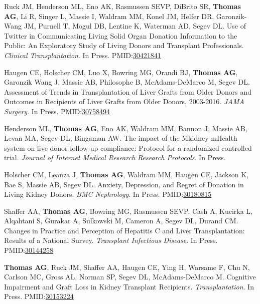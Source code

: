 \documentclass[10pt]{article}
\makeatletter
\newlength{\bibhang}
\newlength{\bibsep}
 {\@listi \global\bibsep\itemsep \global\advance\bibsep by\parsep}
\newenvironment{bibenum*}
  {\renewcommand\labelenumi{[\theenumi]}%
   \etaremune[
     topsep=0pt,
     itemsep=\bibsep,
     parsep=0pt,partopsep=0pt,
     itemindent=-\bibhang,
     leftmargin={\bibhang+\widthof{[999]}}]}
  {\endetaremune}
\newcommand{\pmid}[1]{PMID:\href{https://www.ncbi.nlm.nih.gov/pubmed/#1}{#1}}
\makeatother
\begin{document}
\begin{bibenum*}
\item Ruck JM\dag, Henderson ML\dag, Eno AK, Rasmussen SEVP,
  DiBrito SR, \textbf{Thomas AG}, Li R, Singer L, Massie I, Waldram MM,
  Konel JM, Helfer DR, Garonzik-Wang JM, Purnell T,
  Mogul DB, Lentine K, Waterman AD, Segev DL.
  Use of Twitter in Communicating Living Solid Organ Donation Information
  to the Public: An Exploratory Study of Living Donors and
  Transplant Professionals.
  \emph{Clinical Transplantation}. In Press.
  \pmid{30421841} 

\item Haugen CE, Holscher CM, Luo X, Bowring MG, Orandi BJ, \textbf{Thomas AG},
  Garonzik Wang J, Massie AB, Philosophe B, McAdams-DeMarco M, Segev DL.
  Assessment of Trends in Transplantation of Liver Grafts from Older Donors
  and Outcomes in Recipients of Liver Grafts from Older Donors, 2003-2016.
  \emph{JAMA Surgery}. In Press.
  \pmid{30758494} 

\item Henderson ML, \textbf{Thomas AG}, Eno AK, Waldram MM, Bannon J,
  Massie AB, Levan MA, Segev DL, Bingaman AW.
  The impact of the Mkidney mHealth system on live donor
  follow-up compliance: Protocol for a randomized controlled trial.
  \emph{Journal of Internet Medical Research Research Protocols}. In Press.

\item Holscher CM, Leanza J, \textbf{Thomas AG}, Waldram MM, Haugen CE,
  Jackson K, Bae S, Massie AB, Segev DL. Anxiety, Depression, and
  Regret of Donation in Living Kidney Donors.
  \emph{BMC Nephrology}. In Press.
  \pmid{30180815} 

\item Shaffer AA, \textbf{Thomas AG}, Bowring MG, Rasmussen SEVP,
  Cash A, Kucirka L, Alqahtani S, Gurakar A, Sulkowski M, Cameron A,
  Segev DL, Durand CM. Changes in Practice and Perception of Hepatitis
  C and Liver Transplantation: Results of a National Survey.
  \emph{Transplant Infectious Disease}. In Press.
  \pmid{30144258} 

\item \textbf{Thomas AG\dag}, Ruck JM\dag, Shaffer AA, Haugen CE, Ying H,
  Warsame F, Chu N, Carlson MC, Gross AL,
  Norman SP, Segev DL, McAdams-DeMarco M.
  Cognitive Impairment and Graft Loss in Kidney Transplant Recipients.
  \emph{Transplantation}. In Press.
  \pmid{30153224} 


\end{bibenum*}
\end{document}
